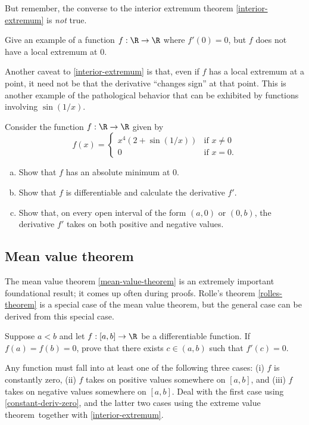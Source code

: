 But remember, the converse to the interior extremum theorem \ref{interior-extremum} is \emph{not} true. 

\begin{exercise} \label{interior-extremum-converse-false}
	Give an example of a function $f : \R \to \R$ where $f'(0) = 0$, but $f$ does not have a local extremum at 0. 
\end{exercise}

Another caveat to \cref{interior-extremum} is that, even if $f$ has a local extremum at a point, it need not be that the derivative ``changes sign'' at that point. This is another example of the pathological behavior that can be exhibited by functions involving $\sin(1/x)$. 

\begin{exercise} \label{extremum-no-sign-change}
	Consider the function $f : \R \to \R$ given by 
	\[ f(x) = \begin{cases} x^4 \left( 2 + \sin(1/x) \right) & \text{if } x \neq 0 \\ 0 & \text{if } x = 0. \end{cases} \]
	\begin{enumerate}[(a)]
		\item Show that $f$ has an absolute minimum at 0. 
		\item Show that $f$ is differentiable and calculate the derivative $f'$. 
		\item Show that, on every open interval of the form $(a, 0)$ or $(0, b)$, the derivative $f'$ takes on both positive and negative values. 
	\end{enumerate}
\end{exercise}

\subsection{Mean value theorem}

The mean value theorem \ref{mean-value-theorem} is an extremely important foundational result; it comes up often during proofs. Rolle's theorem \ref{rolles-theorem} is a special case of the mean value theorem, but the general case can be derived from this special case. 

\begin{exercise} \label{rolles-theorem}
	Suppose $a < b$ and let $f : [a, b] \to \R$ be a differentiable function. If $f(a) = f(b) = 0$, prove that there exists $c \in (a, b)$ such that $f'(c) = 0$. \begin{hint} Any function must fall into at least one of the following three cases: (i) $f$ is constantly zero, (ii) $f$ takes on positive values somewhere on $[a, b]$, and (iii) $f$ takes on negative values somewhere on $[a, b]$. Deal with the first case using \cref{constant-deriv-zero}, and the latter two cases using the extreme value theorem\footnotemark\ together with \cref{interior-extremum}. 
	\end{hint}
\end{exercise}

